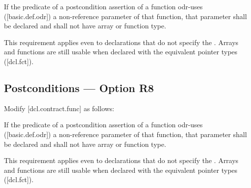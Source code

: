 \begin{adjustwidth}{0.5cm}{0.5cm}
If the predicate of a postcondition assertion of a function odr-uses ([basic.def.odr]) a
non-reference parameter of that function, that parameter shall be declared  and shall not have array or function type.
\begin{note}
This requirement applies even to declarations
that do not specify the . Arrays and functions are still usable when declared with the equivalent pointer types ([dcl.fct]).
\end{note}
\begin{example}
\tcode{[...]}
\end{example}

\end{adjustwidth}

\subsection*{Postconditions --- Option R8}

Modify [dcl.contract.func] as follows:

\begin{adjustwidth}{0.5cm}{0.5cm}
If the predicate of a postcondition assertion of a function odr-uses ([basic.def.odr]) a
non-reference parameter of that function, that parameter shall be declared  and shall not have array or function type.
\begin{note}
This requirement applies even to declarations
that do not specify the . Arrays and functions are still usable when declared with the equivalent pointer types ([dcl.fct]).
\end{note}
\begin{example}
\tcode{[...]}
\end{example}
\end{adjustwidth}

